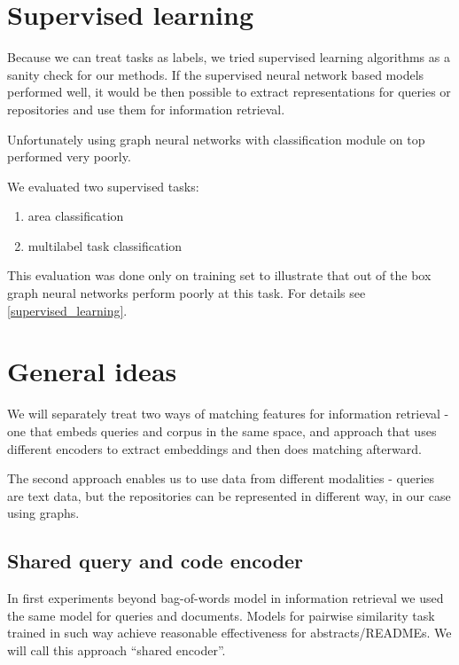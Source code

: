 \documentclass[11pt]{report}
\begin{document}
\section{Supervised learning}

Because we can treat tasks as labels, we tried supervised learning
algorithms as a sanity check for our methods. If the supervised neural network
based models performed
well, it would be then possible to extract representations for queries or
repositories and use them for information retrieval.

Unfortunately using graph neural networks with classification module
on top performed very poorly.

We evaluated two supervised tasks:

\begin{enumerate}
\item area classification
\item multilabel task classification
\end{enumerate}

This evaluation was done only on training set to illustrate that out of the box
graph neural networks perform poorly at this task. For details see \ref{supervised_learning}.

\section{General ideas}

We will separately treat two ways of matching features for information retrieval
- one that embeds queries and corpus in the same space, and approach that uses
different encoders to extract embeddings and then does matching afterward.

The second approach enables us to use data from different modalities - queries
are text data, but the repositories can be represented in different way, in our
case using graphs.

\label{general_ideas}

\subsection{Shared query and code encoder}
In first experiments beyond bag-of-words model in information retrieval we used the same model for queries and
documents. Models for pairwise similarity task trained in such way achieve reasonable effectiveness
for abstracts/READMEs. We will call this approach ``shared encoder''.
\end{document}
